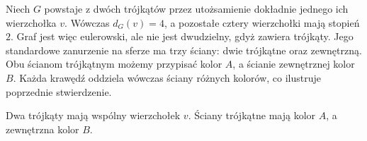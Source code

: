 \begin{przyklad}
Niech $G$ powstaje z dwóch trójkątów przez
utożsamienie dokładnie jednego ich wierzchołka $v$.
Wówczas $d_G(v)=4$, a pozostałe cztery wierzchołki
mają stopień $2$. Graf jest więc eulerowski,
ale nie jest dwudzielny, gdyż zawiera trójkąty.
Jego standardowe zanurzenie na sferze ma trzy ściany:
dwie trójkątne oraz zewnętrzną.
Obu ścianom trójkątnym możemy przypisać kolor $A$,
a ścianie zewnętrznej kolor $B$.
Każda krawędź oddziela wówczas ściany różnych kolorów,
co ilustruje poprzednie stwierdzenie.
\end{przyklad}

\begin{center}

{\footnotesize Dwa trójkąty mają wspólny wierzchołek $v$.
Ściany trójkątne mają kolor $A$, a zewnętrzna kolor $B$.}
\end{center}


